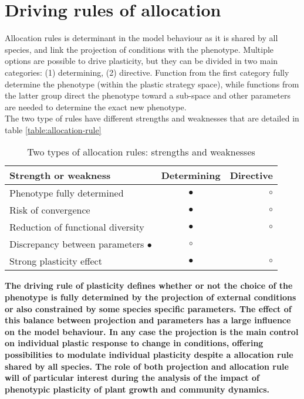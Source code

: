 \section{Driving rules of allocation}\label{section:allocation-rule}

Allocation rules is determinant in the model behaviour as it is shared by all species, and link the projection of conditions with the phenotype. Multiple options are possible to drive plasticity, but they can be divided in two main categories: (1) determining, (2) directive. Function from the first category fully determine the phenotype (within the plastic strategy space), while functions from the latter group direct the phenotype toward a sub-space and other parameters are needed to determine the exact new phenotype.\\
The two type of rules have different strengths and weaknesses that are detailed in table \ref{table:allocation-rule}

\begin{table*}
\caption{Two types of allocation rules: strengths and weaknesses} 
\label{table:state_var_plant}
\begin{center}%
\begin{tabular}{l c r}
Strength or weakness & Determining & Directive \\ 
\hline 
Phenotype fully determined & \textcolor{myGreen}{$\bullet$} & $\circ$ \\
Risk of convergence & $\bullet$ &  $\circ$ \\
Reduction of functional diversity & $\bullet$ &  $\circ$\\
Discrepancy between parameters $\bullet$ &  $\circ$\\
Strong plasticity effect & \textcolor{myGreen}{$\bullet$} & $\circ$
\end{tabular} 
\end{center}
\vspace*{0.5cm}
\end{table*}

\textbf{
The driving rule of plasticity defines whether or not the choice of the  phenotype is fully determined by the projection of external conditions or also constrained by some species specific parameters. The effect of this balance between projection and parameters has a large influence on the model behaviour. In any case the projection is the main control on individual plastic response to change in conditions, offering possibilities to modulate individual plasticity despite a allocation rule shared by all species. The role of both projection and allocation rule will of particular interest during the analysis of the impact of phenotypic plasticity of plant growth and community dynamics.}




